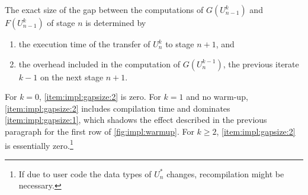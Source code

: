 The exact size of the gap between the computations of $G(U_{n-1}^k)$ and $F(U_{n-1}^k)$ of stage $n$ is determined by
\begin{enumerate}
  \item\label{item:impl:gapsize:1}
    the execution time of the transfer of $U_n^k$ to stage $n+1$, and
  \item\label{item:impl:gapsize:2}
    the overhead included in the computation of $G(U_n^{k-1})$,
    \ie the previous iterate $k-1$ on the next stage $n+1$.
\end{enumerate}
For $k=0$, \ref{item:impl:gapsize:2} is zero.
For $k=1$ and no warm-up, \ref{item:impl:gapsize:2} includes compilation time and dominates \ref{item:impl:gapsize:1},
which shadows the effect described in the previous paragraph for the first row of \autoref{fig:impl:warmup}.
For $k\geq 2$, \ref{item:impl:gapsize:2} is essentially zero.\footnote{%
  If due to user code the data types of $U_n^*$ changes, recompilation might be necessary.
}

